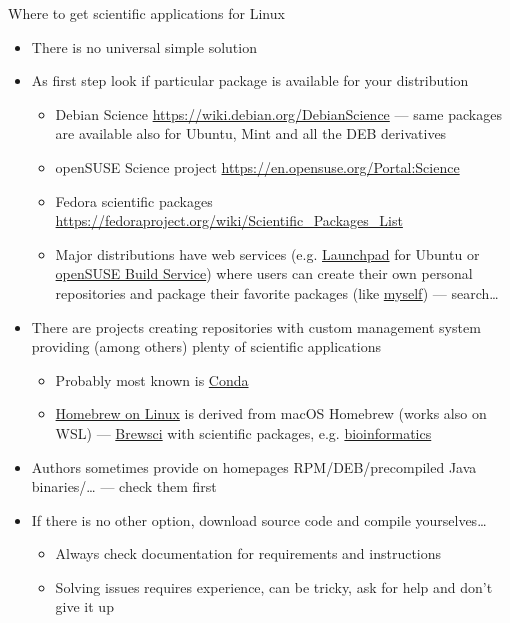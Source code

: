 \documentclass[compress, xelatex, 11pt, xcolor=svgnames, aspectratio=169, url={hyphens, lowtilde}]{beamer}
\begin{document}
\begin{frame}[allowframebreaks]{Where to get scientific applications for Linux}
	\begin{itemize}
		\item There is no universal simple solution
		\item As first step look if particular package is available for your distribution
		\begin{itemize}
			\item Debian Science \url{https://wiki.debian.org/DebianScience} --- same packages are available also for Ubuntu, Mint and all the DEB derivatives
			\item openSUSE Science project \url{https://en.opensuse.org/Portal:Science}
			\item Fedora scientific packages \url{https://fedoraproject.org/wiki/Scientific_Packages_List}
			\item Major distributions have web services (e.g. \href{https://launchpad.net/}{Launchpad} for Ubuntu or \href{https://build.opensuse.org/}{openSUSE Build Service}) where users can create their own personal repositories and package their favorite packages (like \href{https://build.opensuse.org/project/show/home:vojtaeus}{myself}) --- search\ldots
		\end{itemize}
		\item There are projects creating repositories with custom management system providing (among others) plenty of scientific applications
		\begin{itemize}
			\item Probably most known is \href{https://docs.conda.io/}{Conda}
			\item \href{https://docs.brew.sh/Homebrew-on-Linux}{Homebrew on Linux} is derived from macOS Homebrew (works also on WSL) --- \href{https://github.com/brewsci}{Brewsci} with scientific packages, e.g. \href{https://brewsci.github.io/homebrew-bio/}{bioinformatics}
		\end{itemize}
		\item Authors sometimes provide on homepages RPM/DEB/precompiled Java binaries/\ldots{ }--- check them first
		\item If there is no other option, download source code and compile yourselves\ldots
		\begin{itemize}
			\item Always check documentation for requirements and instructions
			\item Solving issues requires experience, can be tricky, ask for help and don't give it up

\end{itemize}
\end{itemize}
\end{frame}
\end{document}
